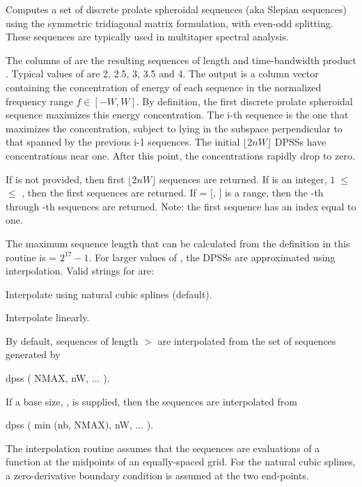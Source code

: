 \noindent Computes a set of discrete prolate spheroidal sequences (aka Slepian sequences) using the symmetric tridiagonal matrix formulation, with even-odd splitting.  These sequences are typically used in multitaper spectral analysis.

The columns of  are the resulting sequences of length  and time-bandwidth product .  Typical values of  are 2, 2.5, 3, 3.5 and 4.  The output  is a column vector containing the concentration of energy of each sequence in the normalized frequency range $f \in [-W,W]$.  By definition, the first discrete prolate spheroidal sequence maximizes this energy concentration.  The i-th sequence is the one that maximizes the concentration, subject to lying in the subspace perpendicular to that spanned by the previous i-1 sequences.  The initial $\lfloor 2nW \rfloor$ DPSSs have concentrations near one.  After this point, the concentrations rapidly drop to zero.

If  is not provided, then first $\lfloor 2nW \rfloor$ sequences are returned.  If  is an integer, $1\;\le$  $ \le$ , then the first  sequences are returned.  If  = [, ] is a range, then the -th through -th sequences are returned.  Note: the first sequence has an index equal to one.

The maximum sequence length that can be calculated from the definition in this routine is  = $2^{17}-1$.  For larger values of , the DPSSs are approximated using interpolation.  Valid strings for  are:
\begin{texitable}
    \item [\var{'spline'}] Interpolate using natural cubic splines (default).
    \item [\var{'linear'}] Interpolate linearly.
\end{texitable}
By default, sequences of length  $>$  are interpolated from the set of sequences generated by
\begin{texiexample}
    dpss ( NMAX, nW, ... ).
\end{texiexample}
\noindent If a base size, , is supplied, then the sequences are interpolated from
\begin{texiexample}
    dpss ( min (nb, NMAX), nW, ... ).
\end{texiexample}
\noindent The interpolation routine assumes that the sequences are evaluations of a function at the midpoints of an equally-spaced grid.  For the natural cubic splines, a zero-derivative boundary condition is assumed at the two end-points.

